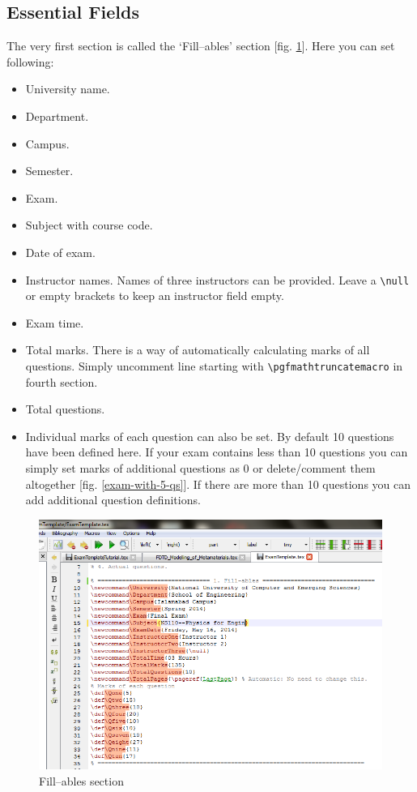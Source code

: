 \documentclass[12pt,a4paper]{article}
\begin{document}
\subsection{Essential Fields}
The very first section is called the `Fill--ables' section [fig. \ref{fill-ables}]. Here you can set following:
\begin{itemize}
\item University name.
\item Department.
\item Campus.
\item Semester.
\item Exam.
\item Subject with course code.
\item Date of exam.
\item Instructor names. Names of three instructors can be provided. Leave a \verb|\null| or empty brackets to keep an instructor field empty.
\item Exam time.
\item Total marks. There is a way of automatically calculating marks of all questions. Simply uncomment line starting with \verb|\pgfmathtruncatemacro| in fourth section.
\item Total questions.
\item Individual marks of each question can also be set. By default 10 questions have been defined here. If your exam contains less than 10 questions you can simply set marks of additional questions as 0 or delete/comment them altogether [fig. \ref{exam-with-5-qs}]. If there are more than 10 questions you can add additional question definitions.
\end{itemize}
\begin{figure}[H]
\centering
\includegraphics[scale=0.75]{Fill-ables.png}
\caption{Fill--ables section}
\label{fill-ables}
\end{figure}
\end{document}
